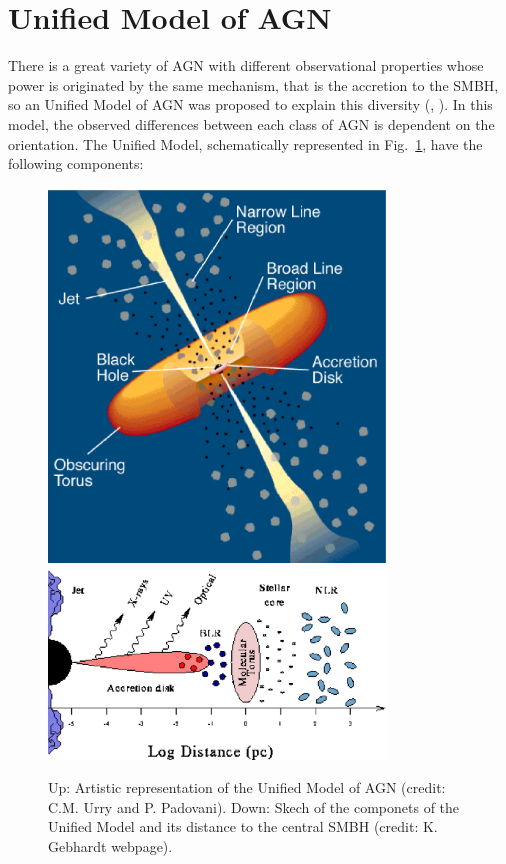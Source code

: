 \section{Unified Model of AGN}
\label{sec1:um}

There is a great variety of AGN with different observational properties whose power is originated by the same mechanism, that is the accretion to the SMBH, so an Unified Model of AGN was proposed to explain this diversity (\citealt{antonucci93}, \citealt{urry95}). In this model, the observed differences between each class of AGN is dependent on the orientation. The Unified Model, schematically represented in Fig.~\ref{sec1:fig_um}, have the following components:




 \begin{figure}
 \centering
 \includegraphics[width=9cm]{Chapter1_intro/umagn.ps}
 \includegraphics[width=9cm]{Chapter1_intro/agnanatomy.ps} 
    \caption{Up: Artistic representation of the Unified Model of AGN (credit: C.M. Urry and P. Padovani). Down: Skech of the componets of the Unified Model and its distance to the central SMBH (credit: K. Gebhardt webpage).}
 \label{sec1:fig_um}
 \end{figure}



